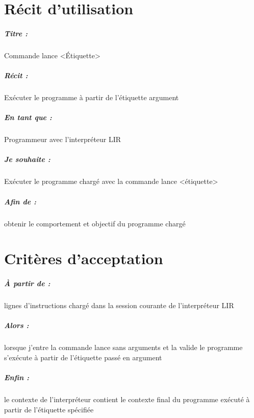 \documentclass[12pt,a5paper, notitle, oneside]{report}
\begin{document}
    \chapter*{Récit d'utilisation}

    \paragraph{Titre : } Commande lance <Étiquette>
    \paragraph{Récit : } Exécuter le programme à partir de l'étiquette argument
    \paragraph{En tant que : } Programmeur avec l'interpréteur LIR
    \paragraph{Je souhaite : } Exécuter le programme chargé avec la commande lance <étiquette>
    \paragraph{Afin de : } obtenir le comportement et objectif du programme chargé
    \newpage

    \chapter*{Critères d'acceptation}

    \paragraph{À partir de : } lignes d'instructions chargé dans la session courante de l'interpréteur LIR
    \paragraph{Alors : } lorsque j'entre la commande lance sans arguments et la valide le programme s'exécute à 
                         partir de l'étiquette passé en argument
    \paragraph{Enfin : } le contexte de l'interpréteur contient le contexte final du programme exécuté à partir de l'étiquette spécifiée
\end{document}
